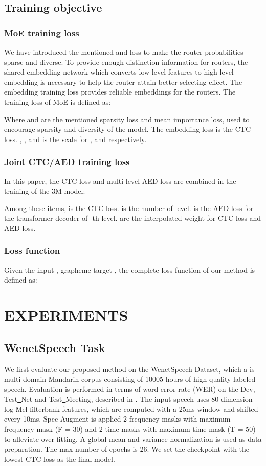 \documentclass[a4paper]{article}
\begin{document}
\subsection{ Training objective}
\subsubsection{ MoE training loss}
We have introduced the mentioned  and  loss to make the router probabilities sparse and diverse. To provide
enough distinction information for routers, the shared embedding network which converts low-level features to high-level
embedding is necessary to help the router attain better selecting effect.  The embedding training loss provides reliable embeddings for the routers. The training loss of MoE is defined as:

Where  and  are the mentioned sparsity  loss and mean importance loss, used to encourage sparsity and diversity of the model. The embedding loss  is the CTC loss. , , and  is the scale for ,  and  respectively.
\subsubsection{ Joint CTC/AED training loss}
In this paper, the CTC loss and multi-level AED loss are combined in the training of the 3M model:
\begin{small}

\end{small}
Among these items,  is the CTC loss.  is the number of level.  is the AED loss for the  transformer decoder of -th level.   are the interpolated weight for CTC loss and AED loss.
\subsubsection{Loss function}
Given the input , grapheme target , the complete loss function of our method is defined as:


\vspace{10pt}
\section{EXPERIMENTS}
\subsection{WenetSpeech Task}
\label{sec:format}
We first evaluate our proposed method on the WenetSpeech\cite{zhang2022wenetspeech} Dataset, which a is multi-domain Mandarin corpus consisting of 10005 hours of high-quality labeled speech.
Evaluation is performed in terms of word error rate (WER) on the Dev, Test\underline{~}Net and Test\underline{~}Meeting, described in \cite{zhang2022wenetspeech}.
The input speech uses 80-dimension log-Mel filterbank features, which are computed with a 25ms window and shifted every 10ms.  Spec-Augment is applied 2 frequency masks with maximum frequency mask (F = 30) and 2 time masks with maximum time mask (T = 50) to alleviate over-fitting. A global mean and variance normalization is used as data preparation. The max number of epochs is 26. We set the checkpoint with the lowest CTC loss as the final model.
\end{document}
